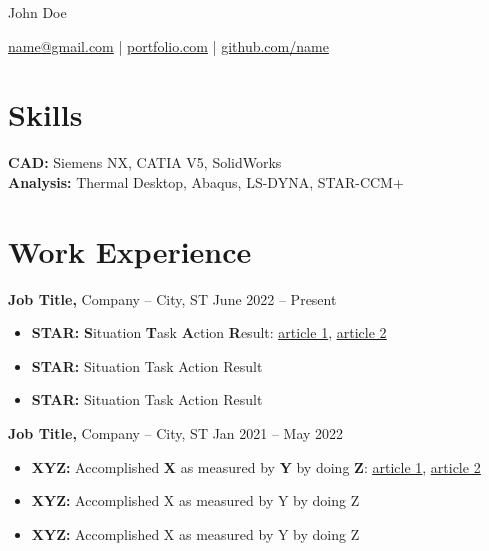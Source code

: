 \documentclass[11pt]{article}       %
\begin{document}
\centerline{\Huge John Doe}

\vspace{5pt}

\centerline{\href{mailto:name@gmail.com}{name@gmail.com} | \href{https://mitcommlab.mit.edu/meche/commkit/portfolio/}{portfolio.com} | \href{https://old.reddit.com/r/EngineeringResumes/wiki/index\#wiki_portfolios}{github.com/name}}

\vspace{-10pt}

\section*{Skills}
\textbf{CAD:} Siemens NX, CATIA V5, SolidWorks \\
\textbf{Analysis:} Thermal Desktop, Abaqus, LS-DYNA, STAR-CCM+

\vspace{-6.5pt}

\section*{Work Experience}
\textbf{Job Title,} {Company} -- City, ST \hfill June 2022 -- Present \\
\vspace{-9pt}
\begin{itemize}
  \item \textbf{STAR:} \textbf{S}ituation \textbf{T}ask \textbf{A}ction \textbf{R}esult: \href{https://www.levels.fyi/blog/applying-star-method-resumes.html}{\underline{article 1}}, \href{https://resumegenius.com/blog/resume-help/star-method-resume}{\underline{article 2}}
  \item \textbf{STAR:} Situation Task Action Result
  \item \textbf{STAR:} Situation Task Action Result
\end{itemize}

\textbf{Job Title,} {Company} -- City, ST \hfill Jan 2021 -- May 2022 \\
\vspace{-9pt}
\begin{itemize}
  \item \textbf{XYZ:} Accomplished \textbf{X} as measured by \textbf{Y} by doing \textbf{Z}: \href{https://www.inc.com/bill-murphy-jr/google-recruiters-say-these-5-resume-tips-including-x-y-z-formula-will-improve-your-odds-of-getting-hired-at-google.html}{\underline{article 1}}, \href{https://elevenrecruiting.com/create-an-effective-resume-xyz-resume-format/}{\underline{article 2}}
  \item \textbf{XYZ:} Accomplished X as measured by Y by doing Z
  \item \textbf{XYZ:} Accomplished X as measured by Y by doing Z
\end{itemize}
\end{document}
